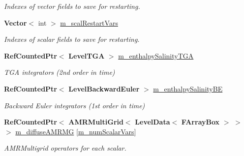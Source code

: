 \begin{DoxyCompactItemize}
\begin{DoxyCompactList}\small\item\em Indexes of vector fields to save for restarting. \end{DoxyCompactList}\item 
\mbox{\label{class_a_m_r_level_mushy_layer_a6edccc174db96d81222d583cccbb567a}} 
\textbf{ Vector}$<$ int $>$ \hyperlink{class_a_m_r_level_mushy_layer_a6edccc174db96d81222d583cccbb567a}{m\+\_\+scal\+Restart\+Vars}
\begin{DoxyCompactList}\small\item\em Indexes of scalar fields to save for restarting. \end{DoxyCompactList}\item 
\mbox{\label{class_a_m_r_level_mushy_layer_ad9fd7d782223f5734e4248dcc6a5d528}} 
\textbf{ Ref\+Counted\+Ptr}$<$ \textbf{ Level\+T\+GA} $>$ \hyperlink{class_a_m_r_level_mushy_layer_ad9fd7d782223f5734e4248dcc6a5d528}{m\+\_\+enthalpy\+Salinity\+T\+GA}
\begin{DoxyCompactList}\small\item\em T\+GA integrators (2nd order in time) \end{DoxyCompactList}\item 
\mbox{\label{class_a_m_r_level_mushy_layer_a8d1324b1db43fa3954c4eeef233198b1}} 
\textbf{ Ref\+Counted\+Ptr}$<$ \textbf{ Level\+Backward\+Euler} $>$ \hyperlink{class_a_m_r_level_mushy_layer_a8d1324b1db43fa3954c4eeef233198b1}{m\+\_\+enthalpy\+Salinity\+BE}
\begin{DoxyCompactList}\small\item\em Backward Euler integrators (1st order in time) \end{DoxyCompactList}\item 
\mbox{\label{class_a_m_r_level_mushy_layer_a470122a7c3d162d76719424d581d8c03}} 
\textbf{ Ref\+Counted\+Ptr}$<$ \textbf{ A\+M\+R\+Multi\+Grid}$<$ \textbf{ Level\+Data}$<$ \textbf{ F\+Array\+Box} $>$ $>$ $>$ \hyperlink{class_a_m_r_level_mushy_layer_a470122a7c3d162d76719424d581d8c03}{m\+\_\+diffuse\+A\+M\+R\+MG} \mbox{[}\hyperlink{mushy_layer_opt_8h_afcada9fb65a998951da882b5c10191fea83db32f5839575c9d7812f3cd0727d07}{m\+\_\+num\+Scalar\+Vars}\mbox{]}
\begin{DoxyCompactList}\small\item\em A\+M\+R\+Multigrid operators for each scalar. \end{DoxyCompactList}\item 

\end{DoxyCompactItemize}
